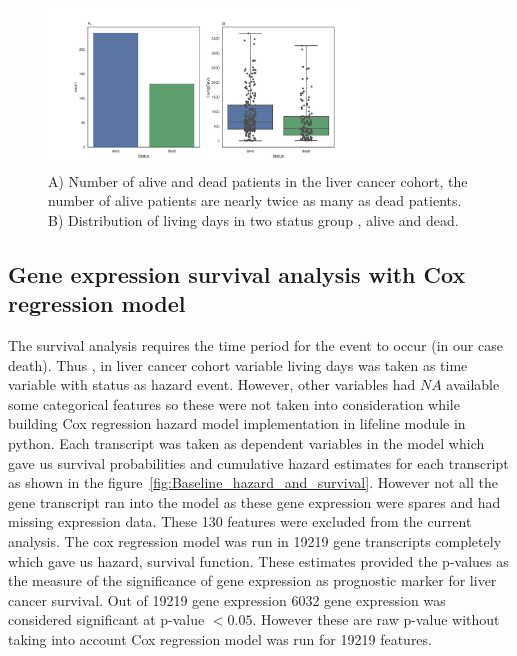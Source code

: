 \documentclass[11pt]{article}
\begin{document}
\begin{figure}[tbh]
    \centering
      \includegraphics[width=0.75\textwidth]{Genderandstatus.png}
    \caption{A) Number of alive and dead patients in the liver cancer cohort, the number of alive patients are nearly twice as many as dead patients. B) Distribution of living days in two status group , alive and dead.\tiny}
    \label{fig:status_livingdays}
\end{figure}

	\subsection {Gene expression survival analysis with Cox regression model }
	
	The survival analysis requires the time period for the event to occur (in our case death). Thus , in liver cancer cohort variable living days was taken as time variable with status as hazard event. However, other variables had $NA$ available  some categorical features so these were not taken into consideration while building Cox regression hazard model implementation in lifeline module in python. Each transcript was taken as dependent variables in the model which gave us survival probabilities and cumulative hazard estimates for each transcript as shown in the figure~\ref{fig:Baseline_hazard_and_survival}. However not all the gene transcript ran into the model as these gene expression were spares and had missing expression data. These 130 features were excluded from the current analysis.  The cox regression model was run in 19219 gene transcripts completely which gave us hazard, survival function. These estimates provided the p-values as the measure of the significance of gene expression as prognostic marker for  liver cancer survival. Out of 19219 gene expression $6032$ gene expression was considered significant at p-value $< 0.05$. However these are raw p-value without taking into account Cox regression model was run for 19219 features.   
	
\end{document}
